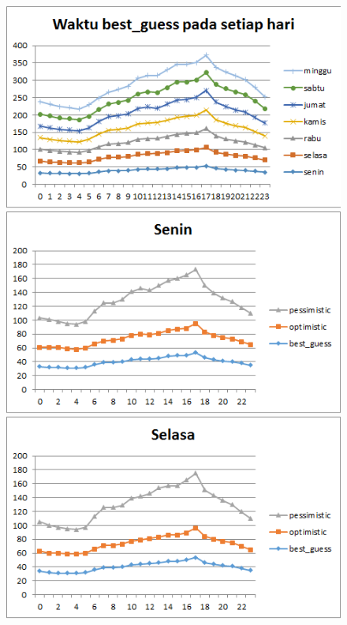 \begin{figure}[H]
				\centering		
				\includegraphics[]{Gambar/waktubestguesssampel108052017.png}
				\includegraphics[]{Gambar/seninsampel108052017.png}
				\includegraphics[]{Gambar/selasasampel108052017.png}
\end{figure}			
			
